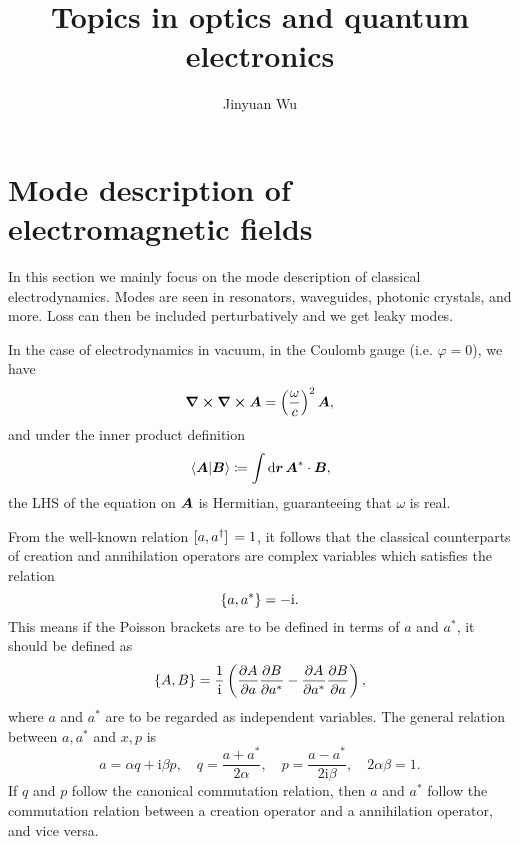 \documentclass[hyperref, a4paper]{article}
\title{Topics in optics and quantum electronics}
\author{Jinyuan Wu}
\newcommand*{\ii}{\mathrm{i}}
\begin{document}
\maketitle

\section{Mode description of electromagnetic fields}

In this section we mainly focus on the mode description of classical electrodynamics.
Modes are seen in resonators, waveguides, photonic crystals, and more.
Loss can then be included perturbatively and we get leaky modes.

In the case of electrodynamics in vacuum, in the Coulomb gauge (i.e. $\varphi = 0$), we have 
\begin{equation}
    \curl\curl{\vb*{A}} = \left(\frac{\omega}{c}\right)^2 \vb*{A}, 
\end{equation}
and under the inner product definition 
\begin{equation}
    \braket*{\vb*{A}}{\vb*{B}} \coloneqq \int \dd{\vb*{r}} \vb*{A}^* \cdot \vb*{B},
\end{equation}
the LHS of the equation on $\vb*{A}$ is Hermitian, guaranteeing that $\omega$ is real.

From the well-known relation $\comm*{a}{a^\dagger} = 1$, 
it follows that the classical counterparts of creation and annihilation operators 
are complex variables which satisfies the relation 
\begin{equation}
    \poissonbracket{a}{a^*} = - \ii.
    \label{eq:a-astar-relation}
\end{equation}
This means if the Poisson brackets are to be defined in terms of $a$ and $a^*$, it should be defined as 
\begin{equation}
    \poissonbracket{A}{B} = \frac{1}{\ii} \left(\pdv{A}{a} \pdv{B}{a^*} - \pdv{A}{a^*} \pdv{B}{a}\right),
    \label{eq:poisson-ab}
\end{equation}
where $a$ and $a^*$ are to be regarded as independent variables.
The general relation between $a, a^*$ and $x, p$ is 
\begin{equation}
    a = \alpha q + \ii \beta p, \quad 
    q = \frac{a + a^*}{2 \alpha}, \quad p = \frac{a - a^*}{2 \ii \beta}, \quad 2 \alpha \beta = 1.
    \label{eq:a-astar-x-p-relation}
\end{equation}
If $q$ and $p$ follow the canonical commutation relation,
then $a$ and $a^*$ follow the commutation relation between 
a creation operator and a annihilation operator, and vice versa. 
\end{document}
